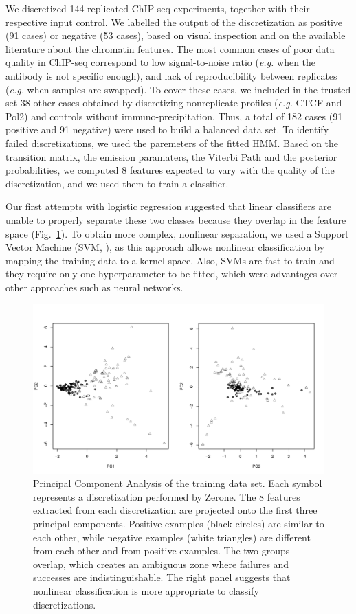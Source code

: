 \documentclass{bioinfo}
\begin{document}
\begin{methods}
We discretized 144 replicated ChIP-seq experiments, together with their
respective input control.
We labelled the output of the discretization as positive (91 cases)
or negative (53 cases), based on visual inspection and on the available
literature about the chromatin features. The most common cases of
poor data quality in ChIP-seq correspond to low signal-to-noise ratio
(\textit{e.g.} when the antibody is not specific enough), and lack of
reproducibility between replicates (\textit{e.g.} when samples are
swapped). To cover these cases, we included in the trusted set
38 other cases obtained by discretizing nonreplicate profiles
(\textit{e.g.} CTCF and Pol2) and controls without immuno-precipitation.
Thus, a total of 182 cases (91 positive and 91 negative) were used to
build a balanced data set. 
To identify failed discretizations, we used the paremeters of the
fitted HMM. Based on the transition matrix, the emission paramaters,
the Viterbi Path and the posterior probabilities,
we computed 8 features expected to vary with the quality
of the discretization, and we used them to train a classifier.

Our first attempts with logistic regression suggested that linear
classifiers are unable to properly separate these two classes because
they overlap in the feature space (Fig.~\ref{fig:pca_bw}). To obtain more
complex, nonlinear separation, we used a Support Vector Machine
(SVM, \citealp{Chang2011,e1071}), as this approach
allows nonlinear classification by mapping
the training data to a kernel space. Also, SVMs are fast to train and
they require only one hyperparameter to be fitted, which were
advantages over other approaches such as neural networks.

\begin{figure}[!tpb]
\centerline{\includegraphics[scale=0.282]{pca_bw.pdf}}
\caption{
  Principal Component Analysis of the training data set.
  Each symbol represents a discretization performed by Zerone. The
  8 features extracted from each discretization are projected onto
  the first three principal components. Positive examples (black
  circles) are similar to each other, while negative examples (white
  triangles) are different from each other and from positive examples.
  The two groups overlap, which creates an ambiguous zone where
  failures and successes are indistinguishable. The right panel
  suggests that nonlinear classification is more appropriate to
  classify discretizations.
}\label{fig:pca_bw}
\end{figure}


\end{methods}
\end{document}
